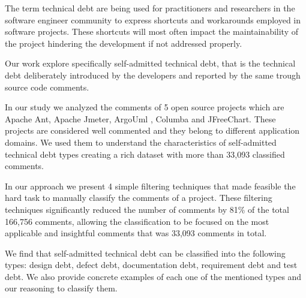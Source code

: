 The term technical debt are being used for practitioners and researchers in the software engineer community to express shortcuts and workarounds employed in software projects. These shortcuts will most often impact the maintainability of the project hindering the development if not addressed properly.

Our work explore specifically self-admitted technical debt, that is the technical debt deliberately introduced by the developers and reported by the same trough source code comments.

In our study we analyzed the comments of 5 open source projects which are Apache Ant, Apache Jmeter, ArgoUml , Columba and JFreeChart. These projects are considered well commented and they belong to different application domains. We used them to understand the characteristics of self-admitted technical debt types creating a rich dataset with more than 33,093 classified comments.

In our approach we present 4 simple filtering techniques that made feasible the hard task to manually classify the comments of a project. These filtering techniques significantly reduced the number of comments by 81\% of the total 166,756 comments, allowing the classification to be focused on the most applicable and insightful comments that was 33,093 comments in total. 

We find that self-admitted technical debt can be classified into the following types: design debt, defect debt, documentation debt, requirement debt and test debt. We also provide concrete examples of each one of the mentioned types and our reasoning to classify them.  


